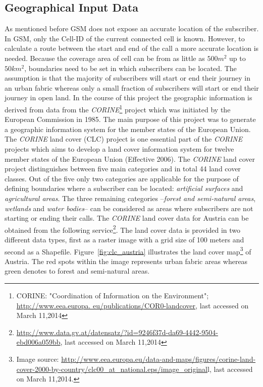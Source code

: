\documentclass[master,english]{hgbthesis}
\begin{document}
\subsection{Geographical Input Data}
As mentioned before GSM does not expose an accurate location of the subscriber. In GSM, only the Cell-ID of the current connected cell is known. However, to calculate a route between the start and end of the call a more accurate location is needed. Because the coverage area of cell can be from as little as  $500m^2$ up to $50km^2$, boundaries need to be set in which subscribers can be located. The assumption is that the majority of subscribers will start or end their journey in an urban fabric whereas only a small fraction of subscribers will start or end their journey in open land.
In the course of this project the geographic information is derived from data from the \emph{CORINE}\footnote{CORINE: "Coordination of Information on the Environment"; \url{http://www.eea.europa.
eu/publications/COR0-landcover}, last accessed on March 11,2014} project which was initiated by the European Commission in 1985. The main purpose of this project was to generate a geographic information system for the member states of the European Union.
The \emph{CORINE} land cover (CLC) project is one essential part of the \emph{CORINE} projects which aims to develop a land cover information system for twelve member states of the European Union (Effective 2006). The \emph{CORINE} land cover project distinguishes between five main categories and in total 44 land cover classes. Out of the five only two categories are applicable for the purpose of defining boundaries where a subscriber can be located: \emph{artificial surfaces} and \emph{agricultural areas}. The three remaining categories --\emph{forest
	and semi-natural areas}, \emph{wetlands} and \emph{water bodies}-- can be considered as areas where subscribers are not starting or ending their calls.
The \emph{CORINE} land cover data for Austria can be obtained from the following service\footnote{\url{http://www.data.gv.at/datensatz/?id=9246f37d-da69-4442-9504-ebd006a059bb},
	last accessed on March 11,2014}. The land cover data is provided in two different data types, first as a raster image with a grid size of 100 meters and second as a Shapefile. Figure~\ref{fig:clc_austria} illustrates the land cover map\footnote{Image source: \url{http://www.eea.europa.eu/data-and-maps/figures/corine-land-cover-2000-by-country/clc00_at_national.eps/image_original}l, last accessed on March 11,2014.} of Austria. The red spots within the image represents urban fabric areas whereas green denotes to forest and semi-natural areas.
\end{document}
